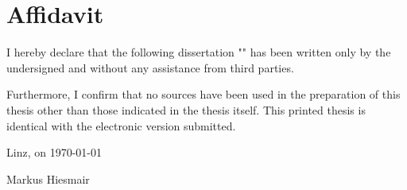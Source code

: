 \chapter*{Affidavit}

I hereby declare that the following dissertation "\thesistitle{}" has been written
only by the undersigned and without any assistance from third parties.

Furthermore, I confirm that no sources have been used in the preparation of this thesis other than those indicated in the thesis itself. This printed thesis is identical with the electronic version submitted.

Linz, on \today

\hfill Markus Hiesmair
